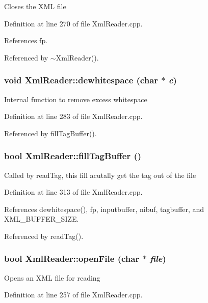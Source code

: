Closes the XML file 

Definition at line 270 of file Xml\-Reader.cpp.

References fp.

Referenced by $\sim$Xml\-Reader().\hypertarget{classXmlReader_b1}{
\subsubsection[dewhitespace]{\setlength{\rightskip}{0pt plus 5cm}void Xml\-Reader::dewhitespace (char $\ast$ {\em c})}}
\label{classXmlReader_b1}


Internal function to remove excess whitespace 

Definition at line 283 of file Xml\-Reader.cpp.

Referenced by fill\-Tag\-Buffer().\hypertarget{classXmlReader_b0}{
\subsubsection[fillTagBuffer]{\setlength{\rightskip}{0pt plus 5cm}bool Xml\-Reader::fill\-Tag\-Buffer ()}}
\label{classXmlReader_b0}


Called by read\-Tag, this fill acutally get the tag out of the file 

Definition at line 313 of file Xml\-Reader.cpp.

References dewhitespace(), fp, inputbuffer, nibuf, tagbuffer, and XML\_\-BUFFER\_\-SIZE.

Referenced by read\-Tag().\hypertarget{classXmlReader_a2}{
\subsubsection[openFile]{\setlength{\rightskip}{0pt plus 5cm}bool Xml\-Reader::open\-File (char $\ast$ {\em file})}}
\label{classXmlReader_a2}


Opens an XML file for reading 

Definition at line 257 of file Xml\-Reader.cpp.


